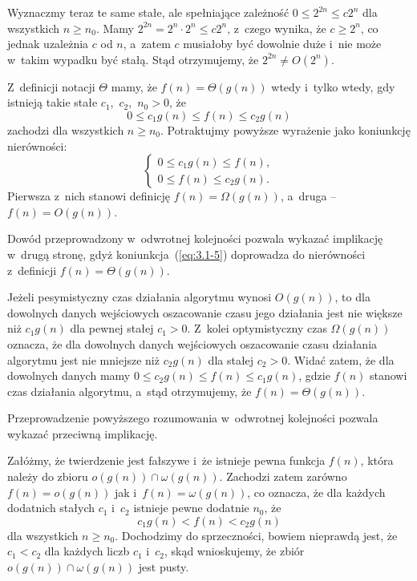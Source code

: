 Wyznaczmy teraz te same stałe, ale spełniające zależność $0\le2^{2n}\le c2^n$ dla wszystkich $n\ge n_0$. Mamy $2^{2n}=2^n\cdot2^n\le c2^n$, z~czego wynika, że $c\ge2^n$, co jednak uzależnia $c$ od $n$, a~zatem $c$ musiałoby być dowolnie duże i~nie może w~takim wypadku być stałą. Stąd otrzymujemy, że $2^{2n}\ne O(2^n)$.

\exercise %
Z~definicji notacji $\Theta$ mamy, że $f(n)=\Theta(g(n))$ wtedy i~tylko wtedy, gdy istnieją takie stałe $c_1$,~$c_2$,~$n_0>0$, że
\[
	0 \le c_1g(n) \le f(n) \le c_2g(n)
\]
zachodzi dla wszystkich $n\ge n_0$. Potraktujmy powyższe wyrażenie jako koniunkcję nierówności:
\begin{equation}
	\begin{cases}
		0 \le c_1g(n) \le f(n), \\
		0 \le f(n) \le c_2g(n).
	\end{cases} \label{eq:3.1-5}
\end{equation}
Pierwsza z~nich stanowi definicję $f(n)=\Omega(g(n))$, a~druga -- $f(n)=O(g(n))$.

Dowód przeprowadzony w~odwrotnej kolejności pozwala wykazać implikację w~drugą stronę, gdyż koniunkcja~(\ref{eq:3.1-5}) doprowadza do nierówności z~definicji $f(n)=\Theta(g(n))$.

\exercise %
Jeżeli pesymistyczny czas działania algorytmu wynosi $O(g(n))$, to dla dowolnych danych wejściowych oszacowanie czasu jego działania jest nie większe niż $c_1g(n)$ dla pewnej stałej $c_1>0$. Z~kolei optymistyczny czas $\Omega(g(n))$ oznacza, że dla dowolnych danych wejściowych oszacowanie czasu działania algorytmu jest nie mniejsze niż $c_2g(n)$ dla stałej $c_2>0$. Widać zatem, że dla dowolnych danych mamy $0\le c_2g(n)\le f(n)\le c_1g(n)$, gdzie $f(n)$ stanowi czas działania algorytmu, a~stąd otrzymujemy, że $f(n)=\Theta(g(n))$.

Przeprowadzenie powyższego rozumowania w~odwrotnej kolejności pozwala wykazać przeciwną implikację.

\exercise %
Załóżmy, że twierdzenie jest fałszywe i~że istnieje pewna funkcja $f(n)$, która należy do zbioru $o(g(n))\cap\omega(g(n))$. Zachodzi zatem zarówno $f(n)=o(g(n))$ jak i~$f(n)=\omega(g(n))$, co oznacza, że dla każdych dodatnich stałych $c_1$ i~$c_2$ istnieje pewne dodatnie $n_0$, że
\[
	c_1g(n) < f(n) < c_2g(n)
\]
dla wszystkich $n\ge n_0$. Dochodzimy do sprzeczności, bowiem nieprawdą jest, że $c_1<c_2$ dla każdych liczb $c_1$ i~$c_2$, skąd wnioskujemy, że zbiór $o(g(n))\cap\omega(g(n))$ jest pusty.

